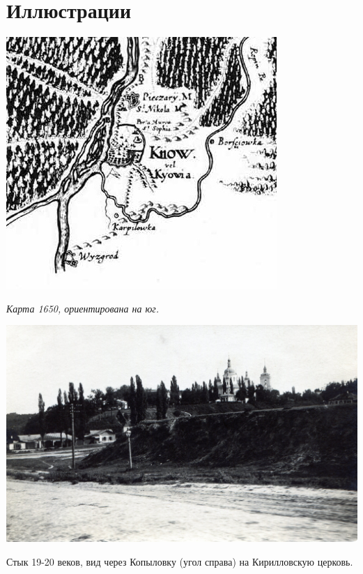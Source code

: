\documentclass[a5paper,11pt,openany]{article}
\begin{document}
\newpage

\section{Иллюстрации}

\vspace*{\fill}

\begin{center}
\includegraphics[width=\linewidth]{1650-repin.jpg}

\textit{Карта 1650, ориентирована на юг.}
\end{center}

\vspace*{\fill}


\newpage


\vspace*{\fill}


\begin{center}
\includegraphics[width=\linewidth]{mid.jpg}

Стык 19-20 веков, вид через Копыловку (угол справа) на Кирилловскую церковь.
\end{center}
\end{document}
